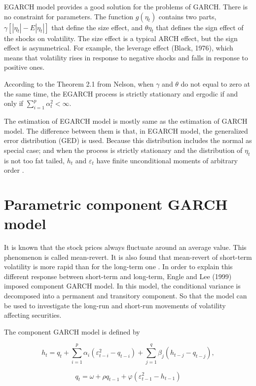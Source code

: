 EGARCH model provides a good solution for the problems of GARCH. There is no constraint for parameters. The function $g(\eta_t)$ contains two parts, $\gamma[|\eta_t|-E|\eta_t|]$ that define the size effect, and  $\theta\eta_t$   that defines the sign effect of the shocks on volatility. The size effect is a typical ARCH effect, but the sign effect is asymmetrical. For example, the leverage effect (Black, 1976), which means that volatility rises in response to negative shocks and falls in response to positive ones. 

According to the Theorem 2.1 from Nelson, when $\gamma$  and $\theta$  do not equal to zero at the same time, the EGARCH process is strictly stationary and ergodic if and only if $\sum_{i=1}^p\alpha_t^2 < \infty$. 

The estimation of EGARCH model is mostly same as the estimation of GARCH model. The difference between them is that, in EGARCH model, the generalized error distribution (GED) is used. Because this distribution includes the normal as special case; and when the process is strictly stationary and the distribution of  $\eta_t$ is not too fat tailed, $h_t$ and $\varepsilon_t$ have finite unconditional moments of arbitrary order \cite{Nelson1991}.

\section{Parametric component GARCH model}

It is known that the stock prices always fluctuate around an average value. This phenomenon is called mean-revert. It is also found that mean-revert of short-term volatility is more rapid than for the long-term one \cite{XinzhongXuandStephenJ.Taylor1994}. In order to explain this different response between short-term and long-term, Engle and Lee (1999) imposed component GARCH model. In this model, the conditional variance is decomposed into a permanent and transitory component. So that the model can be used to investigate the long-run and short-run movements of volatility affecting securities.

The component GARCH model is defined by

\begin{equation}
h_{t}=q_{t}+\sum_{i=1}^{p}\alpha_{i}(\varepsilon_{t-i}^{2}-q_{t-i}) + \sum_{j=1}^{q}\beta_{j}(h_{t-j}-q_{t-j}),
\end{equation}

\begin{equation}
q_{t} = \omega + \rho q_{t-1}  +\varphi(\varepsilon_{t-1}^{2}-h_{t-1})
\end{equation}

